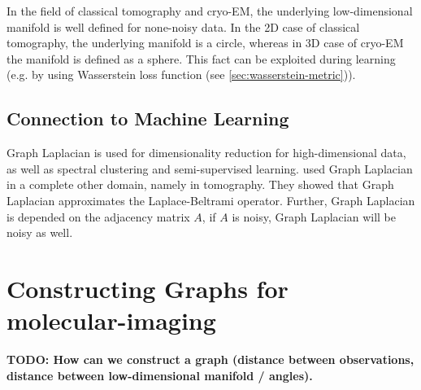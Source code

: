 




\begin{tcolorbox}[colback=red!5!white,colframe=red!75!black]
    In the field of classical tomography and cryo-EM, the underlying low-dimensional manifold is well defined for none-noisy data.
    In the 2D case of classical tomography, the underlying manifold is a circle, whereas in 3D case of cryo-EM the manifold
    is defined as a sphere.
    This fact can be exploited during learning (e.g. by using Wasserstein loss function (see \ref{sec:wasserstein-metric})).
\end{tcolorbox}

\subsection{Connection to Machine Learning}

Graph Laplacian is used for dimensionality reduction for high-dimensional data, as well as spectral clustering and semi-supervised learning.
\citet{LaplaceRandomProjections} used Graph Laplacian in a complete other domain, namely in tomography. 
They showed that Graph Laplacian approximates the Laplace-Beltrami operator.
Further, Graph Laplacian is depended on the adjacency matrix $A$, if $A$ is noisy, Graph Laplacian will be noisy as well.


\section{Constructing Graphs for molecular-imaging}
\textbf{TODO: How can we construct a graph (distance between observations, distance between low-dimensional manifold / angles).}
